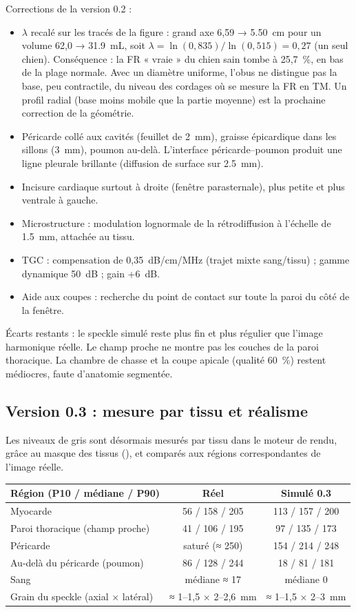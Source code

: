\documentclass[10pt,a4paper]{article}
\newcommand{\vp}[1]{\texttt{\detokenize{#1}}}
\begin{document}
Corrections de la version 0.2 :
\begin{itemize}
\item $\lambda$ recalé sur les tracés de la figure : grand axe 6,59 → \SI{5,50}{cm} pour un volume 62,0 → \SI{31,9}{mL}, soit
$\lambda=\ln(0{,}835)/\ln(0{,}515)=0{,}27$ (un seul chien). Conséquence : la FR « vraie » du chien sain tombe à 25,7~\%,
en bas de la plage normale. Avec un diamètre uniforme, l'obus ne distingue pas la base, peu contractile, du niveau des
cordages où se mesure la FR en TM. Un profil radial (base moins mobile que la partie moyenne) est la prochaine correction
de la géométrie.
\item Péricarde collé aux cavités (feuillet de \SI{2}{mm}), graisse épicardique dans les sillons (\SI{3}{mm}), poumon
au-delà. L'interface péricarde--poumon produit une ligne pleurale brillante (diffusion de surface sur \SI{2,5}{mm}).
\item Incisure cardiaque surtout à droite (fenêtre parasternale), plus petite et plus ventrale à gauche.
\item Microstructure : modulation lognormale de la rétrodiffusion à l'échelle de \SI{1,5}{mm}, attachée au tissu.
\item TGC : compensation de 0,35~dB/cm/MHz (trajet mixte sang/tissu) ; gamme dynamique 50~dB ; gain +6~dB.
\item Aide aux coupes : recherche du point de contact sur toute la paroi du côté de la fenêtre.
\end{itemize}
Écarts restants : le speckle simulé reste plus fin et plus régulier que l'image harmonique réelle. Le champ proche ne
montre pas les couches de la paroi thoracique. La chambre de chasse et la coupe apicale (qualité 60~\%) restent
médiocres, faute d'anatomie segmentée.

\subsection*{Version 0.3 : mesure par tissu et réalisme}
Les niveaux de gris sont désormais mesurés par tissu dans le moteur de rendu, grâce au masque des tissus
(\vp{_internals.grayStats}), et comparés aux régions correspondantes de l'image réelle.

\begin{tabularx}{\linewidth}{@{}Xcc@{}}
\toprule
Région (P10 / médiane / P90) & Réel & Simulé 0.3\\\midrule
Myocarde & 56 / 158 / 205 & 113 / 157 / 200\\
Paroi thoracique (champ proche) & 41 / 106 / 195 & 97 / 135 / 173\\
Péricarde & saturé (≈ 250) & 154 / 214 / 248\\
Au-delà du péricarde (poumon) & 86 / 128 / 244 & 18 / 81 / 181\\
Sang & médiane ≈ 17 & médiane 0\\
Grain du speckle (axial × latéral) & ≈ 1--1,5 × 2--2,6~mm & ≈ 1--1,5 × 2--3~mm\\
\bottomrule
\end{tabularx}
\end{document}
